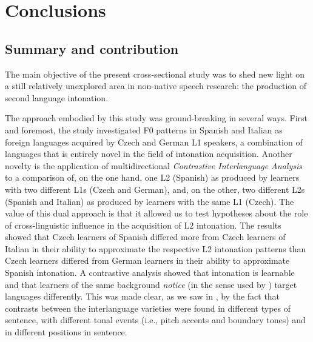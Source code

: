 

\chapter{Conclusions}\label{ch:6}
\section{Summary and contribution}\label{sec:6.1}

The main objective of the present cross-sectional study was to shed new light on a still relatively unexplored area in non-native speech research: the production of second language intonation.


The approach embodied by this study was ground-breaking in several ways. First and foremost, the study investigated F0 patterns in Spanish and Italian as foreign languages acquired by Czech and German L1 speakers, a combination of languages that is entirely novel in the field of intonation acquisition. Another novelty is the application of multidirectional \textit{Contrastive Interlanguage Analysis} \citep{Granger1996} to a comparison of, on the one hand, one L2 (Spanish) as produced by learners with two different L1s (Czech and German), and, on the other, two different L2s (Spanish and Italian) as produced by learners with the same L1 (Czech). The value of this dual approach is that it allowed us to test hypotheses about the role of cross-linguistic influence in the acquisition of L2 intonation. The results showed that Czech learners of Spanish differed more from Czech learners of Italian in their ability to approximate the respective L2 intonation patterns than Czech learners differed from German learners in their ability to approximate Spanish intonation. A contrastive analysis showed that intonation is learnable and that learners of the same background \textit{notice} (in the sense used by \citealt{Schmidt1990}) target languages differently. This was made clear, as we saw in , by the fact that contrasts between the interlanguage varieties were found in different types of sentence, with different tonal events (i.e., pitch accents and boundary tones) and in different positions in sentence.



